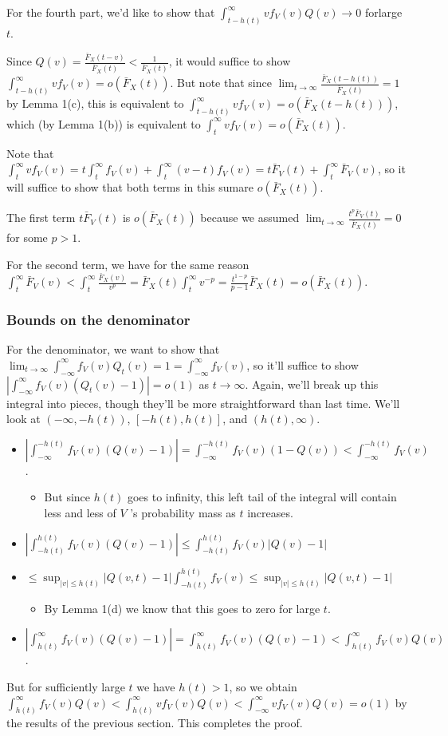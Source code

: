 \documentclass[../neurips_2024.tex]{subfiles}
\begin{document}
For the fourth part, we'd like to show that \(\int_{t-h(t)}^\infty vf_V(v)Q(v) \to 0\) forlarge \(t\).

Since \(Q(v)=\frac{\bar F_X(t-v)}{\bar F_X(t)} < \frac 1{\bar F_X(t)}\), it would suffice to show \(\int_{t-h(t)}^\infty vf_V(v) = o(\bar F_X(t))\). But note that since \(\lim_{t\to\infty}\frac{\bar F_X(t-h(t))}{\bar F_X(t)} = 1\) by Lemma 1(c), this is equivalent to \(\int_{t-h(t)}^\infty vf_V(v) = o(\bar F_X(t-h(t)))\), which (by Lemma 1(b)) is equivalent to \(\int_t^\infty vf_V(v) = o(\bar F_X(t))\).

Note that \(\int_{t}^\infty vf_V(v) = t\int_{t}^\infty f_V(v) + \int_{t}^\infty (v-t)f_V(v) = t\bar F_V(t)+\int_{t}^\infty \bar F_V(v)\), so it will suffice to show that both terms in this sumare \(o(\bar F_X(t))\). 

The first term \(t \bar F_V(t)\) is \(o(\bar F_X(t))\) because we assumed \(\lim_{t\to\infty} \frac{t^p\bar F_V(t)}{\bar F_X(t)}=0\) for some \(p>1\).

For the second term, we have for the same reason \(\int_t^\infty \bar F_V(v) < \int_t^\infty \frac{\bar F_X(v)}{v^p} = \bar F_X(t)\int_t^\infty v^{-p} = \frac{t^{1-p}}{p-1}\bar F_X(t) = o(\bar F_X(t))\).

\subsubsection{Bounds on the denominator}

For the denominator, we want to show that \(\lim_{t\to\infty}\int_{-\infty}^\infty f_V(v)Q_t(v)=1=\int_{-\infty}^\infty f_V(v)\), so it'll suffice to show \(|\int_{-\infty}^\infty f_V(v)(Q_t(v)-1)|=o(1)\) as \(t\to\infty\). Again, we'll break up this integral into pieces, though they'll be more straightforward than last time. We'll look at \((-\infty,-h(t))\), \([-h(t),h(t)]\), and \((h(t),\infty)\).

\begin{itemize}
    \item \(|\int_{-\infty}^{-h(t)}f_V(v)(Q(v)-1)|=\int_{-\infty}^{-h(t)}f_V(v)(1-Q(v))<\int_{-\infty}^{-h(t)}f_V(v)\).
    \begin{itemize}
        \item But since \(h(t)\) goes to infinity, this left tail of the integral will contain less and less of \(V\) 's probability mass as $t$ increases.
    \end{itemize}
    \item \(|\int_{-h(t)}^{h(t)}f_V(v)(Q(v)-1)|\le\int_{-h(t)}^{h(t)}f_V(v)|Q(v)-1|\)
    \item \(\le \sup_{|v| \le h(t)} |Q(v,t)-1|\int_{-h(t)}^{h(t)}f_V(v)\le \sup_{|v| \le h(t)} |Q(v,t)-1|\)
    \begin{itemize}
        \item By Lemma 1(d) we know that this goes to zero for large \(t\).
    \end{itemize}
    \item \(|\int_{h(t)}^\infty f_V(v)(Q(v)-1)| = \int_{h(t)}^\infty f_V(v)(Q(v)-1) < \int_{h(t)}^\infty f_V(v)Q(v)\).
\end{itemize}

But for sufficiently large \(t\) we have \(h(t)>1\), so we obtain
 \(\int_{h(t)}^\infty f_V(v)Q(v)<\int_{h(t)}^\infty v f_V(v)Q(v) < \int_{-\infty}^\infty v f_V(v)Q(v) = o(1)\) 
by the results of the previous section. This completes the proof.
\end{document}
